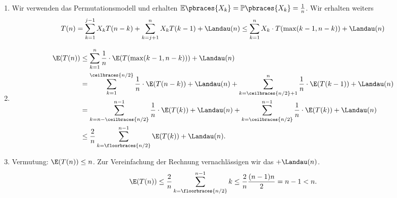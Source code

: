 \begin{solution}

\phantom{}

\begin{enumerate}[label = \alph*)]
  \item Wir verwenden das Permutationsmodell und erhalten $\mathbb{E}\pbraces{X_k} = \mathbb{P}\pbraces{X_k} = \frac{1}{n}$. Wir erhalten weiters
  \begin{align*}
  	T(n) = \sum_{k = 1}^{j - 1} X_k T(n - k) + \sum_{k = j + 1}^{n} X_k T(k - 1) + \Landau(n) \leq \sum_{k=1}^n X_k \cdot T(\max(k-1,n-k)) + \Landau(n)
  \end{align*}
  \item
  \begin{align*}
    \E(T(n)) &\leq \sum_{k=1}^n \frac{1}{n} \cdot \E(T(\max(k-1,n-k))) + \Landau(n) \\
    &= \sum_{k=1}^{\ceilbraces{n/2}} \frac{1}{n} \cdot \E(T(n-k)) + \Landau(n)
    + \sum_{k=\ceilbraces{n/2} + 1}^{n} \frac{1}{n} \cdot \E(T(k-1)) + \Landau(n) \\
    &= \sum_{k=n - \ceilbraces{n/2}}^{n - 1} \frac{1}{n} \cdot \E(T(k)) + \Landau(n)
    + \sum_{k=\ceilbraces{n/2} }^{n - 1} \frac{1}{n} \cdot \E(T(k)) + \Landau(n) \\
    &\leq \frac{2}{n}\sum_{k=\floorbraces{n/2} }^{n - 1} \E(T(k)) + \Landau(n).
  \end{align*}
  \item Vermutung: $\E(T(n)) \leq n$. Zur Vereinfachung der Rechnung vernachlässigen wir
  das $+ \Landau(n)$.
  \begin{align*}
    \E(T(n)) \leq \frac{2}{n}\sum_{k=\floorbraces{n/2} }^{n - 1} k \leq \frac{2}{n}\frac{(n-1)n}{2}
    = n - 1 < n.
  \end{align*}
\end{enumerate}

\end{solution}
